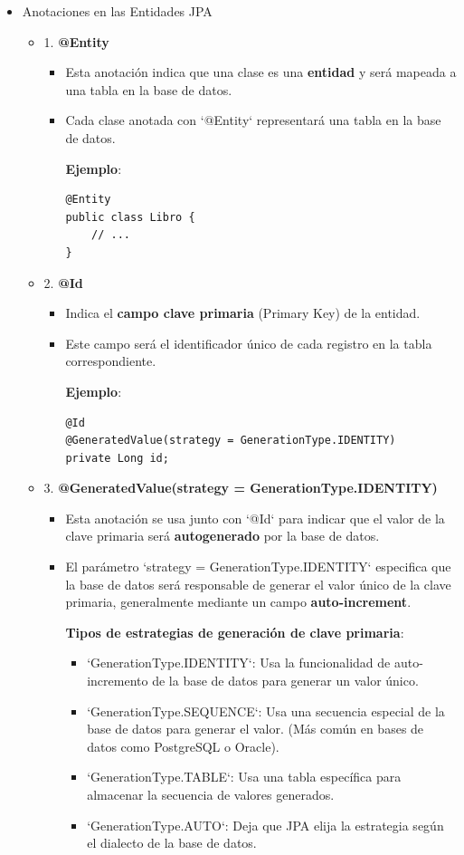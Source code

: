 \documentclass[11pt]{article}
\begin{document}
\begin{itemize}
\item Anotaciones en las Entidades JPA
\label{sec:orgfb1a252}

\begin{itemize}
\item 1. \textbf{\textbf{@Entity}}
\label{sec:orgb6893b9}
\begin{itemize}
\item Esta anotación indica que una clase es una \textbf{\textbf{entidad}} y será mapeada a una tabla en la base de datos.
\item Cada clase anotada con `@Entity` representará una tabla en la base de datos.

\textbf{\textbf{Ejemplo}}:
\begin{verbatim}
@Entity
public class Libro {
    // ...
}
\end{verbatim}
\end{itemize}

\item 2. \textbf{\textbf{@Id}}
\label{sec:orgc114966}
\begin{itemize}
\item Indica el \textbf{\textbf{campo clave primaria}} (Primary Key) de la entidad.
\item Este campo será el identificador único de cada registro en la tabla correspondiente.

\textbf{\textbf{Ejemplo}}:
\begin{verbatim}
@Id
@GeneratedValue(strategy = GenerationType.IDENTITY)
private Long id;
\end{verbatim}
\end{itemize}

\item 3. \textbf{\textbf{@GeneratedValue(strategy = GenerationType.IDENTITY)}}
\label{sec:orge1ace18}
\begin{itemize}
\item Esta anotación se usa junto con `@Id` para indicar que el valor de la clave primaria será \textbf{\textbf{autogenerado}} por la base de datos.
\item El parámetro `strategy = GenerationType.IDENTITY` especifica que la base de datos será responsable de generar el valor único de la clave primaria, generalmente mediante un campo \textbf{\textbf{auto-increment}}.

\textbf{\textbf{Tipos de estrategias de generación de clave primaria}}:
\begin{itemize}
\item `GenerationType.IDENTITY`: Usa la funcionalidad de auto-incremento de la base de datos para generar un valor único.
\item `GenerationType.SEQUENCE`: Usa una secuencia especial de la base de datos para generar el valor. (Más común en bases de datos como PostgreSQL o Oracle).
\item `GenerationType.TABLE`: Usa una tabla específica para almacenar la secuencia de valores generados.
\item `GenerationType.AUTO`: Deja que JPA elija la estrategia según el dialecto de la base de datos.
\end{itemize}


\end{itemize}
\end{itemize}
\end{itemize}
\end{document}
